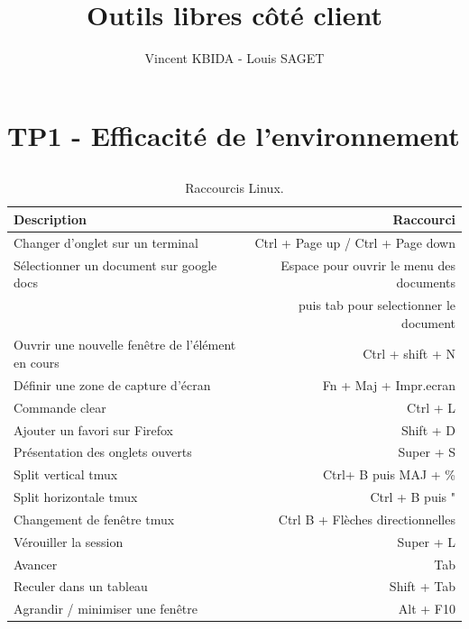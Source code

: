 \documentclass{article}
\title{Outils libres côté client}
\author{Vincent KBIDA - Louis SAGET}
\begin{document}
\maketitle
\tableofcontents
\newpage

\section{TP1 - Efficacité de l'environnement}

\subsection{}

\begin{table}[h]
\centering
\begin{tabular}{l|r}

Description & Raccourci \\\hline
Changer d’onglet sur un terminal & Ctrl + Page up / Ctrl + Page down\\
\hline
Sélectionner un document sur google docs & Espace pour ouvrir le menu des documents\\
 & puis tab pour selectionner le document\\
 \hline
Ouvrir une nouvelle fenêtre de l’élément en cours & Ctrl + shift + N\\
\hline
Définir une zone de capture d’écran & Fn + Maj + Impr.ecran\\
\hline
Commande clear & Ctrl + L\\
\hline
Ajouter un favori sur Firefox & Shift + D\\
\hline
Présentation des onglets ouverts & Super + S\\
\hline
Split vertical tmux & Ctrl+ B puis MAJ + \%\\
\hline
Split horizontale tmux & Ctrl + B puis "\\
\hline
Changement de fenêtre tmux & Ctrl B + Flèches directionnelles\\
\hline
Vérouiller la session & Super + L\\
\hline
Avancer & Tab\\
\hline
Reculer dans un tableau & Shift + Tab\\
\hline
Agrandir / minimiser une fenêtre & Alt + F10


\end{tabular}
\caption{\label{tab:widgets}Raccourcis Linux.}
\end{table}

\subsection{}
\end{document}
